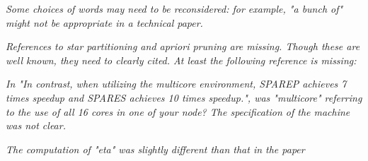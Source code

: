 
\emph{Some choices of words may need to be reconsidered: for example, "a bunch
of" might not be appropriate in a technical paper.}



\emph{References to star partitioning and apriori pruning are missing. Though these
are well known, they need to clearly cited. At least the following reference is
missing:}


\emph{In "In contrast, when utilizing the multicore
environment, SPAREP achieves 7 times speedup and SPARES achieves 10 times speedup.", was "multicore"
referring to the use of all 16 cores in one of your node? The specification of the machine was not clear.}



\emph{The computation of "eta" was slightly different than that in the paper}

